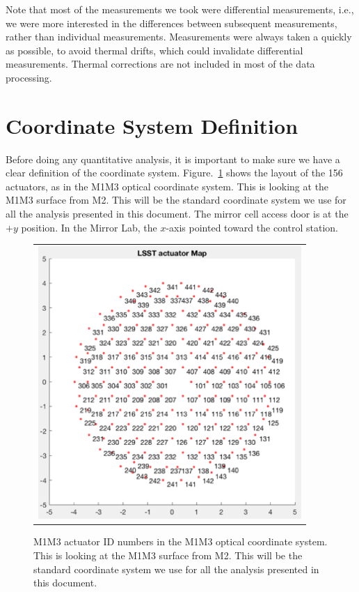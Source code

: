 \documentclass [twoside,openbib,12pt]{article}
\begin{document}
Note that most of the measurements we took were differential
measurements, i.e., we were more interested in the differences between
subsequent measurements, rather than individual
measurements. Measurements were always taken a quickly as possible, to
avoid thermal drifts, which could invalidate differential measurements.
Thermal corrections are not included in most of the data processing.

\section{Coordinate System Definition}

Before doing any quantitative analysis, it is important to make sure
we have a clear definition of the coordinate
system. Figure.~\ref{fig:cs} shows the layout of the 156
actuators, as in the M1M3 optical coordinate system.
This
is looking at the M1M3 surface from M2.
This will be the standard coordinate system we use for all the
analysis presented in this document.
The mirror cell access door is at the $+y$ position.
In the Mirror Lab, the $x$-axis pointed toward the control station.


  \begin{figure}[bthp]
   \begin{center}
   \begin{tabular}{c}
\includegraphics[width=100mm]{figures/cs.png}
  \end{tabular}
   \end{center}
   \caption
  { \label{fig:cs}
M1M3 actuator ID numbers in the M1M3 optical coordinate system. This
is looking at the M1M3 surface from M2. This will be the standard coordinate system we use for all the
analysis presented in this document.
 }
\end{figure}
\end{document}
